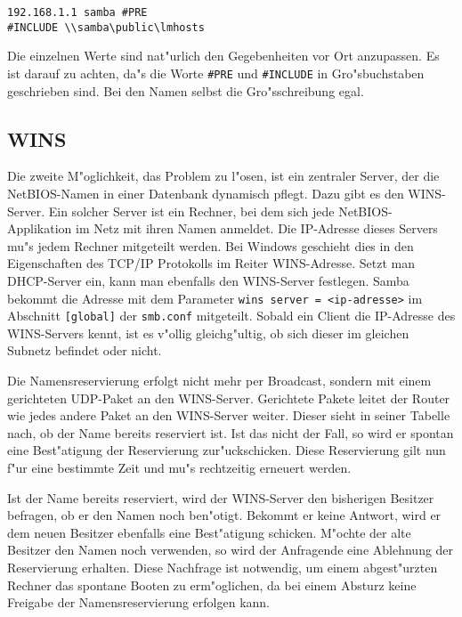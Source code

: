 \documentclass{scrartcl}\usepackage{pslatex}\typearea{12}
\newcommand{\param}{\texttt}
\newcommand{\dateistyle}{\texttt}
\newcommand{\nbname}{\texttt}
\begin{document}
\begin{verbatim}
192.168.1.1 samba #PRE
#INCLUDE \\samba\public\lmhosts
\end{verbatim}

Die einzelnen Werte sind nat"urlich den Gegebenheiten vor Ort
anzupassen. Es ist darauf zu achten, da"s die Worte \nbname{\#PRE} und
\nbname{\#INCLUDE} in Gro"sbuchstaben geschrieben sind. Bei den Namen
selbst die Gro"sschreibung egal.

\subsection{WINS}

Die zweite M"oglichkeit, das Problem zu l"osen, ist ein zentraler
Server, der die NetBIOS-Namen in einer Datenbank dynamisch pflegt.
Dazu gibt es den WINS-Server.  Ein solcher Server ist ein Rechner, bei
dem sich jede NetBIOS-Applikation im Netz mit ihren Namen anmeldet.
Die IP-Adresse dieses Servers mu"s jedem Rechner mitgeteilt werden.
Bei Windows geschieht dies in den Eigenschaften des TCP/IP Protokolls
im Reiter WINS-Adresse. Setzt man DHCP-Server ein, kann man ebenfalls
den WINS-Server festlegen. Samba bekommt die Adresse mit dem Parameter
\param{wins server = <ip-adresse>} im Abschnitt \param{[global]} der
\dateistyle{smb.conf} mitgeteilt. Sobald ein Client die IP-Adresse des
WINS-Servers kennt, ist es v"ollig gleichg"ultig, ob sich dieser im
gleichen Subnetz befindet oder nicht.

Die Namensreservierung erfolgt nicht mehr per Broadcast, sondern mit
einem gerichteten UDP-Paket an den WINS-Server.  Gerichtete Pakete
leitet der Router wie jedes andere Paket an den WINS-Server weiter.
Dieser sieht in seiner Tabelle nach, ob der Name bereits reserviert
ist. Ist das nicht der Fall, so wird er spontan eine Best"atigung der
Reservierung zur"uckschicken. Diese Reservierung gilt nun f"ur eine
bestimmte Zeit und mu"s rechtzeitig erneuert werden.

Ist der Name bereits reserviert, wird der WINS-Server den bisherigen
Besitzer befragen, ob er den Namen noch ben"otigt. Bekommt er keine
Antwort, wird er dem neuen Besitzer ebenfalls eine Best"atigung
schicken. M"ochte der alte Besitzer den Namen noch verwenden, so wird
der Anfragende eine Ablehnung der Reservierung erhalten. Diese
Nachfrage ist notwendig, um einem abgest"urzten Rechner das spontane
Booten zu erm"oglichen, da bei einem Absturz keine Freigabe der
Namensreservierung erfolgen kann.
\end{document}
